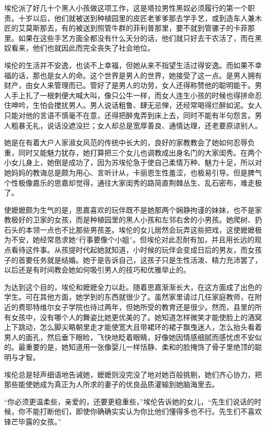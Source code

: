 \par 埃伦派了好几十个黑人小孩做这项工作，这是塔拉男性黑奴必须履行的第一个职责。十岁以后，他们就被送到种植园里的皮匠老爹爹那去学手艺，或到造车人兼木匠的艾莫斯那去，有的被送到照管牛群的菲利普那里，要不就到管骡子的卡菲那里。如果在这些手艺方面全都没有什么天分的话，他们就只好去干农活了，而在黑奴看来，他们也就因此而完全丧失了社会地位。
\par 埃伦的生活并不安逸，也谈不上幸福，但她从来不指望生活过得安逸。而如果不幸福的话，那也是女人的命。这个世界是男人的世界，她接受了这一点。是男人拥有财产，由女人来管理而已。管好了是男人的功劳，女人还得称赞他的聪明能干。男人手上扎了一根刺便大喊大叫，像只公牛一样，而女人连生小孩的时候也得拼命忍住呻吟，生怕会搅扰男人。男人说话粗鲁、肆无忌惮，还经常喝得烂醉如泥。女人只能对他的言语不慎毫不在意，还得把醉鬼弄到床上去，同时不能有半句怨言。男人粗暴无礼，说话没遮没拦；女人却总是宽厚善良、通情达理，还老要原谅别人。
\par 她是在有着大户人家淑女风范的传统中长大的，良好的家教教会了她如何忍辱负重，同时又能魅力犹存，她打算把三个女儿也调教成出身名门的大家闺秀。在两个小女儿身上，她倒是成功了，因为苏埃伦急于使自己柔情万种、魅力十足，所以对她妈妈的教诲总是颇为用心、言听计从，卡丽恩生性羞涩，也极易引导。但是脾气个性极像嘉乐的思嘉却觉得，通往大家闺秀的路简直荆棘丛生、乱石密布，难走极了。
\par 使嬷嬷颇为生气的是，思嘉喜欢的玩伴既不是她那两个娴静拘谨的妹妹，也不是家教极好的卫家的女孩，而是种植园里的黑人小孩和左邻右舍的小男孩。她爬树、扔石头的本领一点也不比那些男孩差。埃伦的女儿居然会玩弄这些把戏，这使嬷嬷极为不安，她经常恳求她“行事要像个小姐”。但埃伦对此忍耐有加，并且用长远的观点看待这件事。从孩提时代起她就知道，小时候的玩伴会变成日后的男友，而女孩子的首要任务就是结婚。她于是告诉自己，这孩子只是生性活泼、精力充沛罢了，以后还是有时间教会她如何吸引男人的技巧和优雅举止的。
\par 为达到这个目的，埃伦和嬷嬷全力以赴。随着思嘉渐渐长大，在这方面成了出色的学生。可在其他方面，她学到的东西就很少了。虽然家里请过几任家庭教师，在附近的费耶特维尔女子学院也待过两年，但她所受的教育还是很少。然而，县里的所有女孩中，没有哪个人的舞姿比她更优美的了。她知道怎样微笑才能使脸上的酒窝上下跳动，怎么脚尖略朝里走才能使宽大且带裙环的裙子飘曳迷人，怎么抬头看着男人的面孔，然后垂下眼睑，飞快地眨着眼睛，好像她因情感细腻而感忧虑不安似的。最重要的是，她知道用一张像婴儿一样恬静、柔和的脸掩饰了骨子里绝顶的聪明与才智。
\par 埃伦总是轻声细语地告诫她，嬷嬷则没完没了地对她百般挑剔，她们齐心协力，把那些能使她成为真正为人所求的妻子的优良品质灌输到她脑海里去。
\par “你必须更温柔些，亲爱的，还要更稳重些，”埃伦告诉她的女儿，“先生们说话的时候，你不能打断他们，即使你确确实实认为你比他们懂得多也不行。先生们不喜欢锋芒毕露的女孩。”
